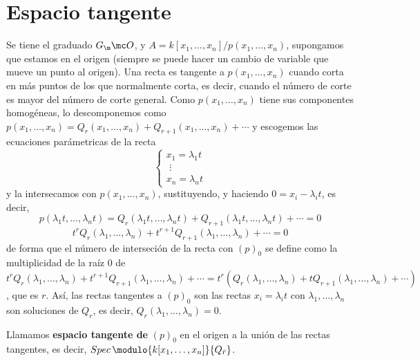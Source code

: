     \section{Espacio tangente}
    Se tiene el graduado $G_\m \mc O$, y $A = k[x_1, \ldots, x_n]/p(x_1, \ldots, x_n)$, supongamos que estamos en el origen (siempre se puede hacer un cambio de variable que mueve un punto al origen). Una recta es tangente a $p(x_1, \ldots, x_n)$ cuando corta en m\'as puntos de los que normalmente corta, es decir, cuando el n\'umero de corte es mayor del n\'umero de corte general. Como $p(x_1, \ldots, x_n)$ tiene sus componentes homog\'eneas, lo descomponemos como $p(x_1, \ldots, x_n) = Q_r(x_1, \ldots, x_n) + Q_{r+1} (x_1, \ldots, x_n) + \cdots $ y escogemos las ecuaciones par\'ametricas de la recta
    $$\begin{cases}
        x_1 = \lambda_1 t\\ \, \, \vdots \\ x_n = \lambda_n t
    \end{cases}$$
    y la intersecamos con $p(x_1, \ldots, x_n)$, sustituyendo, y haciendo $0 = x_i - \lambda_i t$, es decir,
    $$p(\lambda_1 t, \ldots, \lambda_n t) = Q_r(\lambda_1 t, \ldots, \lambda_n t) + Q_{r+1} (\lambda_1 t, \ldots, \lambda_n t) + \cdots = 0 $$
    $$t^r Q_r(\lambda_1 , \ldots, \lambda_n ) + t^{r+1} Q_{r+1}(\lambda_1 , \ldots, \lambda_n ) + \cdots  = 0$$
    de forma que el n\'umero de interseci\'on de la recta con $(p)_0$ se define como la multiplicidad de la ra\'iz 0 de $t^r Q_r(\lambda_1 , \ldots, \lambda_n ) + t^{r+1} Q_{r+1}(\lambda_1 , \ldots, \lambda_n ) + \cdots = t^r (Q_r(\lambda_1 , \ldots, \lambda_n ) + t Q_{r+1}(\lambda_1 , \ldots, \lambda_n ) + \cdots)$, que es $r$. As\'i, las rectas tangentes a $(p)_0$ son las rectas $x_i = \lambda_i t$ con $\lambda_1, \ldots, \lambda_n$ son soluciones de $Q_r$, es decir, $Q_r(\lambda_1 , \ldots, \lambda_n ) = 0$. 

    \begin{defi}
        Llamamos \textbf{espacio tangente de }$(p)_0$ en el origen a la uni\'on de las rectas tangentes, es decir, $Spec\, \modulo{k[x_1, \ldots, x_n]}{Q_{\bar r}}$.       
    \end{defi}

